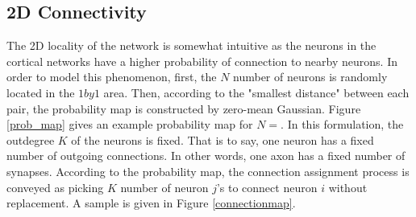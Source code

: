 \documentclass[a4paper,12pt]{article}
\begin{document}
\subsection{2D Connectivity}
The 2D locality of the network is somewhat intuitive as the neurons in the cortical networks have a higher probability of connection to nearby neurons. In order to model this phenomenon, first, the $N$ number of neurons is randomly located in the $1 by 1$ area. Then, according to the "smallest distance" between each pair, the probability map is constructed by zero-mean Gaussian. Figure \ref{prob_map} gives an example probability map for $N = $. In this formulation, the outdegree $K$ of the neurons is fixed. That is to say, one neuron has a fixed number of outgoing connections. In other words, one axon has a fixed number of synapses. According to the probability map, the connection assignment process is conveyed as picking $K$ number of neuron $j$'s to connect neuron $i$ without replacement. A sample is given in Figure \ref{connectionmap}.
\end{document}
